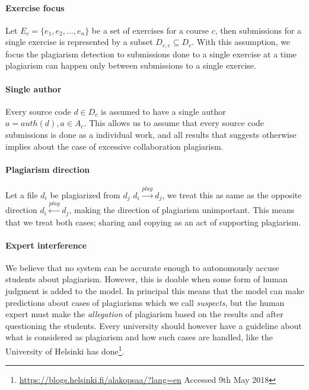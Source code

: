\paragraph{Exercise focus} 
Let $E_c = \{e_1, e_2, ..., e_n\}$ be a set of exercises for a course $c$, then submissions for a single exercise is represented by a subset $D_{c,e} \subseteq D_c$. With this assumption, we focus the plagiarism detection to submissions done to a single exercise at a time \ie plagiarism can happen only between submissions to a single exercise.

\paragraph{Single author} 
Every source code $d \in D_c$ is assumed to have a single author $a = auth(d), a \in A_c$. This allows us to assume that every source code submissions is done as a individual work, and all results that suggests otherwise implies about the case of excessive collaboration \ie plagiarism. 

\paragraph{Plagiarism direction} 
Let a file $d_i$ be plagiarized from $d_j$ \ie $d_i \xrightarrow{plag} d_j$, we treat this as same as the opposite direction $d_i \xleftarrow{plag} d_j$, making the direction of plagiarism unimportant. This means that we treat both cases; sharing and copying as an act of supporting plagiarism. 

\paragraph{Expert interference}
We believe that no system can be accurate enough to autonomously accuse students about plagiarism. However, this is doable when some form of human judgment is added to the model. In principal this means that the model can make predictions about cases of plagiarisms which we call \emph{suspects}, but the human expert must make the \emph{allegation} of plagiarism based on the results and after questioning the students. Every university should however have a guideline about what is considered as plagiarism and how such cases are handled, like the University of Helsinki has done\footnote{\url{https://blogs.helsinki.fi/alakopsaa/?lang=en} Accessed 9th May 2018}.





